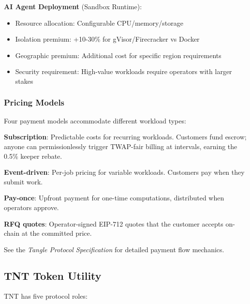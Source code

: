 \documentclass[11pt,a4paper]{article}
\begin{document}
\textbf{AI Agent Deployment} (Sandbox Runtime):
\begin{itemize}[noitemsep]
    \item Resource allocation: Configurable CPU/memory/storage
    \item Isolation premium: +10-30\% for gVisor/Firecracker vs Docker
    \item Geographic premium: Additional cost for specific region requirements
    \item Security requirement: High-value workloads require operators with larger stakes
\end{itemize}

\subsubsection{Pricing Models}

Four payment models accommodate different workload types:

\textbf{Subscription}: Predictable costs for recurring workloads. Customers fund escrow; anyone can permissionlessly trigger TWAP-fair billing at intervals, earning the 0.5\% keeper rebate.

\textbf{Event-driven}: Per-job pricing for variable workloads. Customers pay when they submit work.

\textbf{Pay-once}: Upfront payment for one-time computations, distributed when operators approve.

\textbf{RFQ quotes}: Operator-signed EIP-712 quotes that the customer accepts on-chain at the committed price.

See the \textit{Tangle Protocol Specification} for detailed payment flow mechanics.

\subsection{TNT Token Utility}

TNT has five protocol roles:
\end{document}
